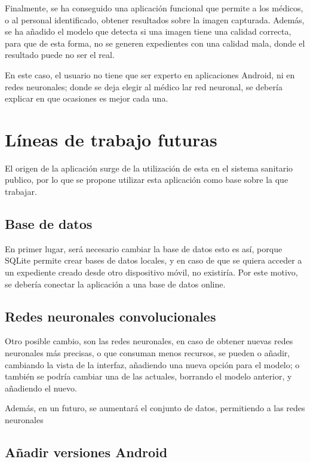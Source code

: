 Finalmente, se ha conseguido una aplicación funcional que permite a los médicos, o al personal identificado, obtener resultados sobre la imagen capturada. Además, se ha añadido el modelo que detecta si una imagen tiene una calidad correcta, para que de esta forma, no se generen expedientes con una calidad mala, donde el resultado puede no ser el real. 

En este caso, el usuario no tiene que ser experto en aplicaciones Android, ni en redes neuronales; donde se deja elegir al médico lar red neuronal, se debería explicar en que ocasiones es mejor cada una.

\section{Líneas de trabajo futuras}

El origen de la aplicación surge de la utilización de esta en el sistema sanitario publico, por lo que se propone utilizar esta aplicación como base sobre la que trabajar. 

\subsection{Base de datos}

En primer lugar, será necesario cambiar la base de datos esto es así, porque SQLite permite crear bases de datos locales, y en caso de que se quiera acceder a un expediente creado desde otro dispositivo móvil, no existiría. Por este motivo, se debería conectar la aplicación a una base de datos online.

\subsection{Redes neuronales convolucionales}

Otro posible cambio, son las redes neuronales, en caso de obtener nuevas redes neuronales más precisas, o que consuman menos recursos, se pueden o añadir, cambiando la vista de la interfaz, añadiendo una nueva opción para el modelo; o también se podría cambiar una de las actuales, borrando el modelo anterior, y añadiendo el nuevo.

Además, en un futuro, se aumentará el conjunto de datos, permitiendo a las redes neuronales 

\subsection{Añadir versiones Android}

